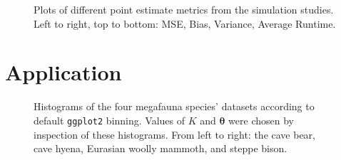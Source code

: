 \begin{figure}[ht]
    \centering
    
    \caption{Plots of different point estimate metrics from the simulation studies. Left to right, top to bottom: MSE, Bias, Variance, Average Runtime.}
    \label{fig:sim-exp-grid}
\end{figure}

\section{Application}
\begin{figure}[ht]
    \centering
    
    \caption{Histograms of the four megafauna species' datasets according to default \texttt{ggplot2} binning. Values of $K$ and $\bm{\theta}$ were chosen by inspection of these histograms. From left to right: the cave bear, cave hyena, Eurasian woolly mammoth, and steppe bison.}
    \label{fig:applications-histograms}
\end{figure}

